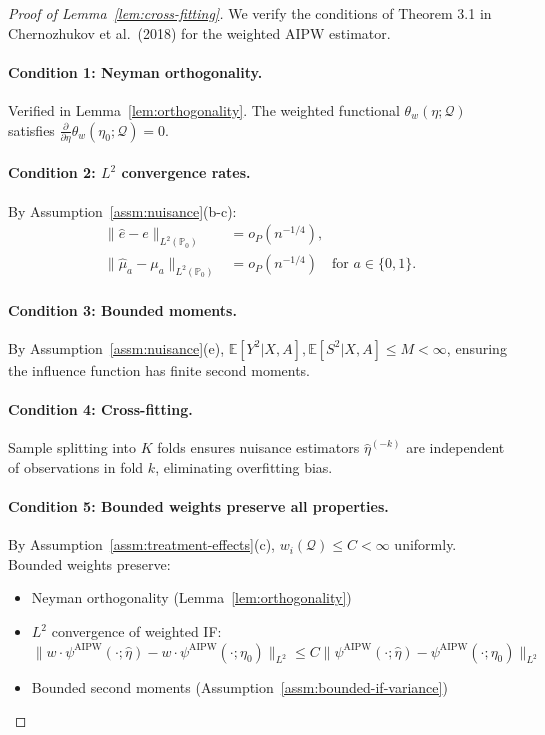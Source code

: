 \begin{proof}[Proof of Lemma~\ref{lem:cross-fitting}]
We verify the conditions of Theorem 3.1 in Chernozhukov et al.\ (2018) for the weighted AIPW estimator.

\paragraph{Condition 1: Neyman orthogonality.}
Verified in Lemma~\ref{lem:orthogonality}. The weighted functional $\theta_w(\eta; \mathcal{Q})$ satisfies $\frac{\partial}{\partial\eta}\theta_w(\eta_0; \mathcal{Q}) = 0$.

\paragraph{Condition 2: $L^2$ convergence rates.}
By Assumption~\ref{assm:nuisance}(b-c):
\begin{align}
\|\hat{e} - e\|_{L^2(\mathbb{P}_0)} &= o_P(n^{-1/4}), \\
\|\hat{\mu}_a - \mu_a\|_{L^2(\mathbb{P}_0)} &= o_P(n^{-1/4}) \quad \text{for } a \in \{0,1\}.
\end{align}

\paragraph{Condition 3: Bounded moments.}
By Assumption~\ref{assm:nuisance}(e), $\mathbb{E}[Y^2|X,A], \mathbb{E}[S^2|X,A] \leq M < \infty$, ensuring the influence function has finite second moments.

\paragraph{Condition 4: Cross-fitting.}
Sample splitting into $K$ folds ensures nuisance estimators $\hat{\eta}^{(-k)}$ are independent of observations in fold $k$, eliminating overfitting bias.

\paragraph{Condition 5: Bounded weights preserve all properties.}
By Assumption~\ref{assm:treatment-effects}(c), $w_i(\mathcal{Q}) \leq C < \infty$ uniformly. Bounded weights preserve:
\begin{itemize}
\item Neyman orthogonality (Lemma~\ref{lem:orthogonality})
\item $L^2$ convergence of weighted IF: $\|w \cdot \psi^{\text{AIPW}}(\cdot; \hat{\eta}) - w \cdot \psi^{\text{AIPW}}(\cdot; \eta_0)\|_{L^2} \leq C \|\psi^{\text{AIPW}}(\cdot; \hat{\eta}) - \psi^{\text{AIPW}}(\cdot; \eta_0)\|_{L^2}$
\item Bounded second moments (Assumption~\ref{assm:bounded-if-variance})
\end{itemize}


\end{proof}
